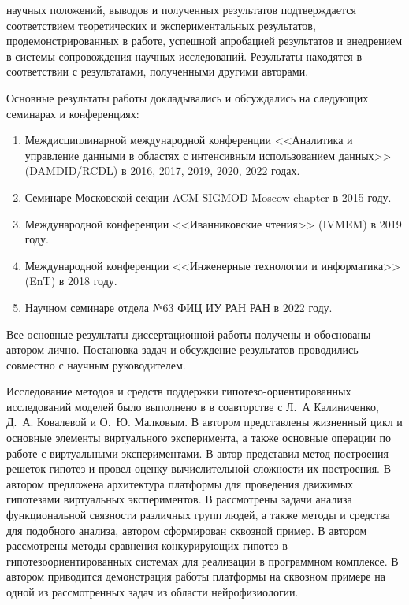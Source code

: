 {\reliability} 
научных положений, выводов и полученных результатов подтверждается соответствием
теоретических и экспериментальных результатов, продемонстрированных в работе, успешной апробацией результатов и 
внедрением в системы сопровождения научных исследований. 
Результаты находятся в соответствии с результатами, полученными другими авторами.


{\probation}
Основные результаты работы докладывались и обсуждались на следующих семинарах и конференциях:
\begin{enumerate}
    \item Междисциплинарной международной конференции <<Аналитика и управление данными в областях с интенсивным 
    использованием данных>> (DAMDID/RCDL) в 2016, 2017, 2019, 2020, 2022 годах.
    \item Семинаре Московской секции ACM SIGMOD Moscow chapter в 2015 году.
    \item Международной конференции <<Иванниковские чтения>> (IVMEM) в 2019 году.
    \item Международной конференции <<Инженерные технологии и информатика>> (EnT) в 2018 году.	
    \item Научном семинаре отдела №63 ФИЦ ИУ РАН РАН в 2022 году.

\end{enumerate}

{\contribution} 
Все основные результаты диссертационной работы получены и обоснованы автором лично. 
Постановка задач и обсуждение результатов проводились совместно с научным руководителем. 

Исследование методов и средств поддержки гипотезо-ориентированных исследований моделей было выполнено в
\cite{kalinichenko2015methods} в соавторстве с Л.~А Калиниченко, Д.~А. Ковалевой и О.~Ю. Малковым.
В \cite{kovalev2017organization, kovalev2019virtual} автором представлены жизненный цикл и основные элементы 
виртуального эксперимента, а также основные операции по работе с виртуальными экспериментами. 
В \cite{kovalev2019constructing} автор представил метод построения решеток гипотез и провел оценку вычислительной сложности 
их построения. 
В \cite{kovalev2020architecture} автором предложена архитектура платформы для проведения движимых гипотезами 
виртуальных экспериментов. 
В \cite{kovalev2017search, kovalev2020multidisciplinary, kovalev2020methods} рассмотрены задачи анализа 
функциональной связности различных групп людей, а также методы и средства для подобного анализа, автором сформирован 
сквозной пример. 
В \cite{tirikov2021methods} автором рассмотрены методы сравнения конкурирующих гипотез 
в гипотезоориентированных системах для реализации в программном комплексе.
В \cite{} автором приводится демонстрация работы платформы на сквозном примере на одной из рассмотренных задач из 
области нейрофизиологии.


